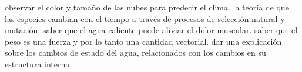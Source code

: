 \documentclass[12pt,addpoints,answers]{repaso}
\begin{document}
\begin{questions}
{\begin{multicols}{2}
\begin{parts}
                      \begin{checkboxes}
                           \CorrectChoice observar el color y tamaño de las nubes para predecir el clima.
                           \choice la teoría de que las especies cambian con el tiempo a través de procesos de selección natural y mutación.
                           \CorrectChoice saber que el agua caliente puede aliviar el dolor muscular.
                           \choice saber que el peso es una fuerza y por lo tanto una cantidad vectorial.
                           \choice dar una explicación sobre los cambios de estado del agua, relacionados con los cambios en su estructura interna.
                      \end{checkboxes}
  
                     
  
  
                 \end{parts}
            \end{multicols}
       }

\end{questions}
\end{document}
